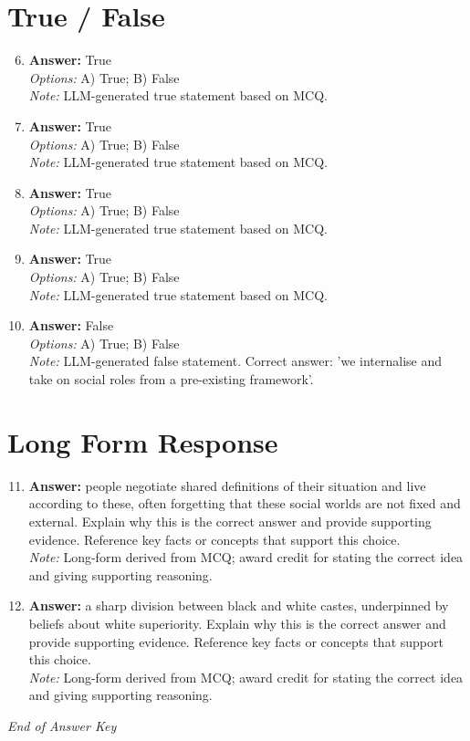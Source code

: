 \documentclass[12pt]{article}
\begin{document}
\section*{True / False}
\begin{enumerate}[label=\arabic*.]
\setcounter{enumi}{5}
\item \textbf{Answer:} True
\\ \textit{Options:} A) True; B) False
\\ \textit{Note:} LLM-generated true statement based on MCQ.
\item \textbf{Answer:} True
\\ \textit{Options:} A) True; B) False
\\ \textit{Note:} LLM-generated true statement based on MCQ.
\item \textbf{Answer:} True
\\ \textit{Options:} A) True; B) False
\\ \textit{Note:} LLM-generated true statement based on MCQ.
\item \textbf{Answer:} True
\\ \textit{Options:} A) True; B) False
\\ \textit{Note:} LLM-generated true statement based on MCQ.
\item \textbf{Answer:} False
\\ \textit{Options:} A) True; B) False
\\ \textit{Note:} LLM-generated false statement. Correct answer: 'we internalise and take on social roles from a pre-existing framework'.
\end{enumerate}

\section*{Long Form Response}
\begin{enumerate}[label=\arabic*.]
\setcounter{enumi}{10}
\item \textbf{Answer:} people negotiate shared definitions of their situation and live according to these, often forgetting that these social worlds are not fixed and external. Explain why this is the correct answer and provide supporting evidence. Reference key facts or concepts that support this choice.
\\ \textit{Note:} Long-form derived from MCQ; award credit for stating the correct idea and giving supporting reasoning.
\item \textbf{Answer:} a sharp division between black and white castes, underpinned by beliefs about white superiority. Explain why this is the correct answer and provide supporting evidence. Reference key facts or concepts that support this choice.
\\ \textit{Note:} Long-form derived from MCQ; award credit for stating the correct idea and giving supporting reasoning.
\end{enumerate}

\vfill
\noindent\textit{End of Answer Key}
\end{document}
